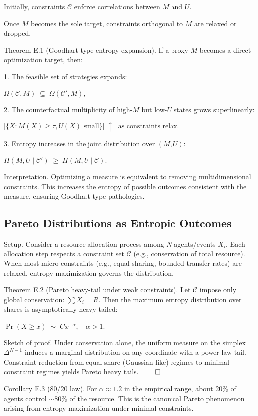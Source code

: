 \documentclass{article}
\begin{document}
Initially, constraints $\mathcal{C}$ enforce correlations between $M$ and $U$.

Once $M$ becomes the sole target, constraints orthogonal to $M$ are relaxed or dropped.

Theorem E.1 (Goodhart-type entropy expansion).
If a proxy $M$ becomes a direct optimization target, then:

1. The feasible set of strategies expands:

$\Omega(\mathcal{C}, M) \;\subseteq\; \Omega(\mathcal{C}', M)$,

2. The counterfactual multiplicity of high-$M$ but low-$U$ states grows superlinearly:

$|\{X: M(X)\ge \tau, U(X) \text{ small}\}| \;\uparrow\; \text{ as constraints relax.}$

3. Entropy increases in the joint distribution over $(M,U)$:

$H(M,U\mid \mathcal{C}') \;\ge\; H(M,U\mid \mathcal{C})$.

Interpretation. Optimizing a measure is equivalent to removing multidimensional constraints. This increases the entropy of possible outcomes consistent with the measure, ensuring Goodhart-type pathologies.

\subsection{Pareto Distributions as Entropic Outcomes}

Setup.
Consider a resource allocation process among $N$ agents/events $X_i$. Each allocation step respects a constraint set $\mathcal{C}$ (e.g., conservation of total resource). When most micro-constraints (e.g., equal sharing, bounded transfer rates) are relaxed, entropy maximization governs the distribution.

Theorem E.2 (Pareto heavy-tail under weak constraints).
Let $\mathcal{C}$ impose only global conservation: $\sum X_i = R$. Then the maximum entropy distribution over shares is asymptotically heavy-tailed:

$\Pr(X\ge x) \;\sim\; C x^{-\alpha}, \quad \alpha>1$.

Sketch of proof.
Under conservation alone, the uniform measure on the simplex $\Delta^{N-1}$ induces a marginal distribution on any coordinate with a power-law tail. Constraint reduction from equal-share (Gaussian-like) regimes to minimal-constraint regimes yields Pareto heavy tails. $\qed$

Corollary E.3 (80/20 law).
For $\alpha\approx 1.2$ in the empirical range, about 20\% of agents control $\sim$80\% of the resource. This is the canonical Pareto phenomenon arising from entropy maximization under minimal constraints.
\end{document}

